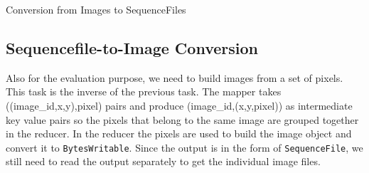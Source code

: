 \documentclass{acm_proc_article-sp}
\begin{document}
\begin{algorithm}[!htb]
\SetAlgoVlined
{}

\caption{Conversion from Images to SequenceFiles}
\end{algorithm}


\subsection{Sequencefile-to-Image Conversion}
Also for the evaluation purpose, we need to build images from a set of pixels. This task is the inverse of the previous task. The mapper takes ((image\_id,x,y),pixel) pairs and produce (image\_id,(x,y,pixel)) as intermediate key value pairs so the pixels that belong to the same image are grouped together in the reducer. In the reducer the pixels are used to build the image object and convert it to \texttt{BytesWritable}. Since the output is in the form of \texttt{SequenceFile}, we still need to read the output separately to get the individual image files.
\end{document}
